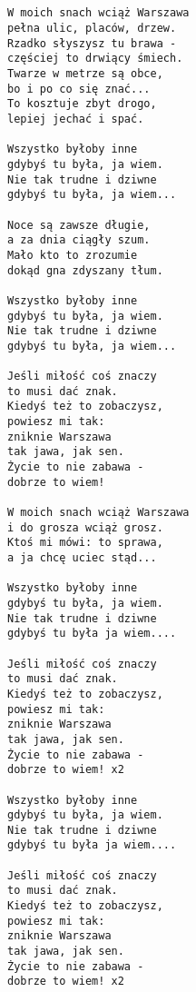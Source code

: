 \documentclass[12pt]{article}
\begin{document}
\subsection*{}
\begin{multicols}{2}
\begin{verbatim}
W moich snach wciąż Warszawa
pełna ulic, placów, drzew.
Rzadko słyszysz tu brawa -
częściej to drwiący śmiech.
Twarze w metrze są obce,
bo i po co się znać...
To kosztuje zbyt drogo,
lepiej jechać i spać.

Wszystko byłoby inne
gdybyś tu była, ja wiem.
Nie tak trudne i dziwne
gdybyś tu była, ja wiem...

Noce są zawsze długie,
a za dnia ciągły szum.
Mało kto to zrozumie
dokąd gna zdyszany tłum.

Wszystko byłoby inne
gdybyś tu była, ja wiem.
Nie tak trudne i dziwne
gdybyś tu była, ja wiem...

Jeśli miłość coś znaczy
to musi dać znak.
Kiedyś też to zobaczysz,
powiesz mi tak:
zniknie Warszawa
tak jawa, jak sen.
Życie to nie zabawa -
dobrze to wiem!

W moich snach wciąż Warszawa
i do grosza wciąż grosz.
Ktoś mi mówi: to sprawa,
a ja chcę uciec stąd...

Wszystko byłoby inne
gdybyś tu była, ja wiem.
Nie tak trudne i dziwne
gdybyś tu była ja wiem....

Jeśli miłość coś znaczy
to musi dać znak.
Kiedyś też to zobaczysz,
powiesz mi tak:
zniknie Warszawa
tak jawa, jak sen.
Życie to nie zabawa -
dobrze to wiem! x2

Wszystko byłoby inne
gdybyś tu była, ja wiem.
Nie tak trudne i dziwne
gdybyś tu była ja wiem....

Jeśli miłość coś znaczy
to musi dać znak.
Kiedyś też to zobaczysz,
powiesz mi tak:
zniknie Warszawa
tak jawa, jak sen.
Życie to nie zabawa -
dobrze to wiem! x2
\end{verbatim}
\end{multicols}
\clearpage
\end{document}
